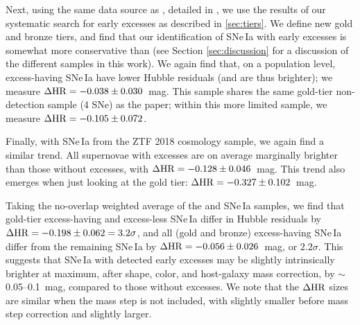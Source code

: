 \documentclass[twocolumn,twocolappendix, linenumbers]{aastex631} %
\begin{document}
Next, using the same data source as \cite{Burke22a}, detailed in \cite{Yao19}, we use the results of our systematic search for early excesses as described in \ref{sec:tiers}.  We define new gold and bronze tiers, and find that our identification of SNe\,Ia with early excesses is somewhat more conservative than \cite{Burke22a} (see Section \ref{sec:discussion} for a discussion of the different samples in this work).  We again find that, on a population level, excess-having SNe\,Ia have lower Hubble residuals (and are thus brighter); we measure $\Delta {\rm HR} = -0.038 \pm 0.030$~mag. This sample shares the same gold-tier non-detection sample (4 SNe) as the \cite{Burke22a} paper; within this more limited sample, we measure $\Delta {\rm HR} = -0.105 \pm 0.072$. 

Finally, with SNe\,Ia from the ZTF 2018 cosmology sample, we again find a similar trend. All supernovae with excesses are on average marginally brighter than those without excesses, with $\Delta {\rm HR} = -0.128 \pm 0.046$~mag. This trend also emerges when just looking at the gold tier:  $\Delta {\rm HR} = -0.327 \pm 0.102$~mag. 

Taking the no-overlap weighted average of the \citet{Yao19} and \citet{Dhawan22} SNe\,Ia samples, we find that gold-tier excess-having and excess-less SNe\,Ia differ in Hubble residuals by $\Delta {\rm HR} = -0.198 \pm 0.062 = 3.2 \sigma$, and all (gold and bronze) excess-having SNe\,Ia differ from the remaining SNe\,Ia by $\Delta {\rm HR} = -0.056 \pm 0.026$~mag, or $2.2 \sigma$. This suggests that SNe\,Ia with detected early excesses may be slightly intrinsically brighter at maximum, after shape, color, and host-galaxy mass correction, by $\sim$0.05--0.1~mag, compared to those without excesses.  We note that the $\Delta {\rm HR}$ sizes are similar when the mass step is not included, with \citet{Yao19} slightly smaller before mass step correction and \citet{Dhawan22} slightly larger.

\end{document}
